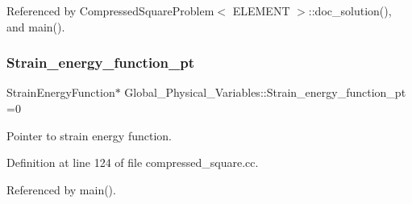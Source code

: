 Referenced by Compressed\+Square\+Problem$<$ E\+L\+E\+M\+E\+N\+T $>$\+::doc\+\_\+solution(), and main().

\mbox{\label{namespaceGlobal__Physical__Variables_a73135f793690b4386bf83bbefc7bf310}} 
\subsubsection{\texorpdfstring{Strain\+\_\+energy\+\_\+function\+\_\+pt}{Strain\_energy\_function\_pt}}
{\footnotesize\ttfamily Strain\+Energy\+Function$\ast$ Global\+\_\+\+Physical\+\_\+\+Variables\+::\+Strain\+\_\+energy\+\_\+function\+\_\+pt =0}



Pointer to strain energy function. 



Definition at line 124 of file compressed\+\_\+square.\+cc.



Referenced by main().

